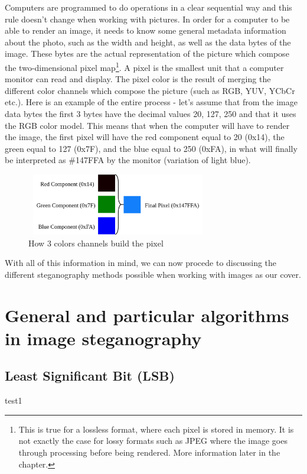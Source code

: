 \begin{multicols*}{2}
Computers are programmed to do operations in a clear sequential way and this rule doesn't change when working with pictures. In order for a computer to be able to render an image, it needs to know some general metadata information about the photo, such as the width and height, as well as the data bytes of the image. These bytes are the actual representation of the picture which compose the two-dimensional pixel map\footnote{This is true for a lossless format, where each pixel is stored in memory. It is not exactly the case for lossy formats such as JPEG where the image goes through processing before being rendered. More information later in the chapter.}. A pixel is the smallest unit that a computer monitor can read and display. The pixel color is the result of merging the different color channels which compose the picture (such as RGB, YUV, YCbCr etc.). Here is an example of the entire process - let's assume that from the image data bytes the first 3 bytes have the decimal values 20, 127, 250 and that it uses the RGB color model. This means that when the computer will have to render the image, the first pixel will have the red component equal to 20 (0x14), the green equal to 127 (0x7F), and the blue equal to 250 (0xFA), in what will finally be interpreted as \#147FFA by the monitor (variation of light blue). 

\begin{figure}[H]
    \centering
    \includegraphics[width=8cm,height=2.7cm,keepaspectratio]{pics/how_a_pixel_works}
    \caption{How 3 colors channels build the pixel}
    \label{Pixel Creation}
\end{figure}

With all of this information in mind, we can now procede to discussing the different steganography methods possible when working with images as our cover.

\end{multicols*}


\section{General and particular algorithms in image steganography}
\subsection{Least Significant Bit (LSB)}
test1
